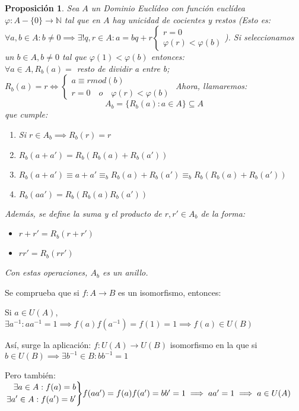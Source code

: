 \documentclass[11pt, a4paper, titlepage]{article}
\makeatletter
\renewenvironment{proof}[1][\proofname] {\vspace{-15pt}\par\pushQED{\qed}\normalfont\topsep6\p@\@plus6\p@\relax\trivlist\item[\hskip\labelsep\it#1\@addpunct{.}]\ignorespaces}{\popQED\endtrivlist\@endpefalse}
\providecommand{\nat}{\mathbb{N}}
\theoremstyle{theorem-style}
\newtheorem*{nprop}{Proposición}
\theoremstyle{definition-style}
\theoremstyle{remark-style}
\theoremstyle{example-style}
\newenvironment{rcases}
  {\left.\begin{aligned}}
  {\end{aligned}\right\rbrace}
\makeatother
\begin{document}
\begin{nprop}
	Sea $A$ un Dominio Euclídeo con función euclídea $\varphi :A-\{0\} \to \nat$ tal que en $A$ hay unicidad de cocientes y restos (Esto es: $\forall a,b \in A: b\ne 0 \implies \exists ! q,r\in A : a=bq+r \begin{cases}
	r = 0 \\
	\varphi(r) < \varphi(b)
\end{cases}$). Si seleccionamos un $b \in A, b \ne 0$ tal que $\varphi(1) < \varphi(b)$ entonces:\\
$\forall a \in A, R_b(a)=$ resto de dividir a entre b; $R_b(a) = r \iff \begin{cases}
	a \equiv r mod(b)\\
	r = 0 \quad o \quad \varphi(r) < \varphi(b)
\end{cases}$
Ahora, llamaremos: $$ A_b = \{ R_b(a): a \in A\} \subseteq A$$ que cumple:

\begin{enumerate}
	\item Si $r\in A_b \implies R_b(r) = r$
	\item $R_b(a+a') = R_b(R_b(a) + R_b(a'))$\\
	\begin{proof}
	$R_b(a+a') \equiv a+a' \equiv_b R_b(a) +R_b(a') \equiv_b R_b(R_b(a) + R_b(a'))$
\end{proof}
	\item $R_b(aa') = R_b(R_b(a)R_b(a'))$
\end{enumerate}

Además, se define la suma y el producto de $r,r' \in A_b$ de la forma:
\begin{itemize}
	\item $r+r' = R_b(r+r')$
	\item $rr' = R_b(rr')$
\end{itemize}

Con estas operaciones, $A_b$ es un anillo.
\end{nprop}


Se comprueba que si $f: A \to B$ es un isomorfismo, entonces:

Si $a \in U(A)$,$\exists a^{-1}: aa^{-1} = 1\implies f(a)f(a^{-1}) = f(1) = 1 \implies f(a) \in U(B)$

Así, surge la aplicación: $f: U(A) \to U(B)$ isomorfismo en la que si $b\in U(B) \implies \exists b^{-1} \in B : bb^{-1} = 1$


Pero también:\\
 $\begin{rcases}
	\exists a \in A: f(a) = b\\
	\exists a' \in A: f(a') = b'
\end{rcases} f(aa') = f(a)f(a') =bb' = 1 \implies aa' = 1 \implies a \in U(A)$
\end{document}
